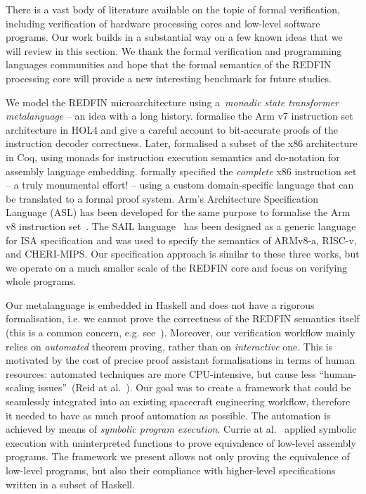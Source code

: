 There is a vast body of literature available on the topic of formal verification,
including verification of hardware processing cores and low-level software programs.
Our work builds in a substantial way on a few known ideas that we will review in
this section. We thank the formal verification and programming languages
communities and hope that the formal semantics of the REDFIN processing core
will provide a new interesting benchmark for future studies.

We model the REDFIN microarchitecture using a~\emph{monadic state transformer
metalanguage} -- an idea with a long history.
\citet{fox2010trustworthy} formalise the Arm v7 instruction
set architecture in HOL4 and give a careful account to bit-accurate proofs of
the instruction decoder correctness. Later, \citet{kennedy2013coq}
formalised a subset of the x86 architecture in Coq, using monads for instruction
execution semantics and \textsf{do}-notation for assembly language embedding.
\citet{degenbaev2012formal} formally specified the \emph{complete} x86
instruction set -- a truly monumental effort! -- using a custom domain-specific
language that can be translated to a formal proof system. Arm's Architecture
Specification Language (ASL) has been developed for the same purpose to formalise the
Arm v8 instruction set~\cite{reid2016cav}. The SAIL language~\cite{SAIL-lang} has
been designed as a generic language for ISA specification and was used to
specify the semantics of ARMv8-a, RISC-v, and CHERI-MIPS.
Our specification approach is similar to these three works, but we operate on a
much smaller scale of the REDFIN core and focus on verifying whole programs.

Our metalanguage is embedded in Haskell and does not have a rigorous
formalisation, i.e. we cannot prove the correctness of the REDFIN semantics
itself (this is a common concern, e.g. see~\cite{reid2017oopsla}). Moreover, our
verification workflow mainly relies on \emph{automated} theorem proving, rather
than on \emph{interactive} one. This is motivated by the cost of precise proof
assistant formalisations in terms of human resources: automated techniques are
more CPU-intensive, but cause less ``human-scaling issues''~(Reid at
al.~\cite{reid2016cav}). Our goal was to create a framework that could be seamlessly
integrated into an existing spacecraft engineering workflow, therefore it needed
to have as much proof automation as possible. The automation is achieved by means
of \emph{symbolic program execution}. Currie at al.~\cite{Currie2006} applied
symbolic execution with uninterpreted functions to prove equivalence of low-level
assembly programs. The framework we present allows not only proving the
equivalence of low-level programs, but also their compliance with higher-level
specifications written in a subset of Haskell.

